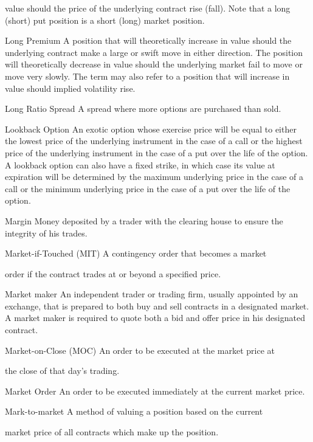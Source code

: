value should the price of the underlying contract rise (fall). Note that a long (short) put position is a short (long) market position.\par
Long Premium A position that will theoretically increase in value should the underlying contract make a large or swift move in either direction. The position will theoretically decrease in value should the underlying market fail to move or move very slowly. The term may also refer to a position that will increase in value should implied volatility rise.\par
Long Ratio Spread A spread where more options are purchased than sold.\par
Lookback Option An exotic option whose exercise price will be equal to either the lowest price of the underlying instrument in the case of a call or the highest price of the underlying instrument in the case of a put over the life of the option. A lookback option can also have a fixed strike, in which case its value at expiration will be determined by the maximum underlying price in the case of a call or the minimum underlying price in the case of a put over the life of the option.\par
Margin Money deposited by a trader with the clearing house to ensure the integrity of his trades.\par
Market-if-Touched (MIT) A contingency order that becomes a market\par
order if the contract trades at or beyond a specified price.\par
Market maker An independent trader or trading firm, usually appointed by an exchange, that is prepared to both buy and sell contracts in a designated market. A market maker is required to quote both a bid and offer price in his designated contract.\par
Market-on-Close (MOC) An order to be executed at the market price at\par
the close of that day's trading.\par
Market Order An order to be executed immediately at the current market price.\par
Mark-to-market A method of valuing a position based on the current\par
market price of all contracts which make up the position.\par

